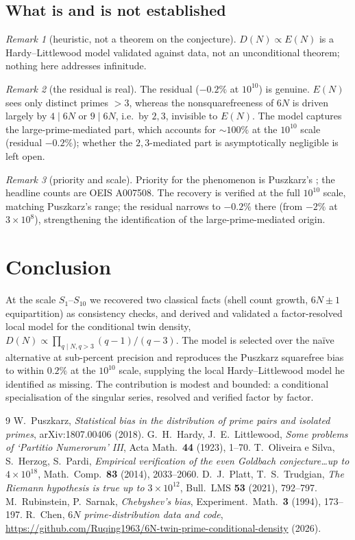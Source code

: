 \documentclass[11pt]{article}
\theoremstyle{definition}
\theoremstyle{remark}
\newtheorem{remark}{Remark}
\begin{document}
\subsection{What is and is not established}
\begin{remark}[heuristic, not a theorem on the conjecture]
$D(N)\propto E(N)$ is a Hardy--Littlewood model validated against data, not an
unconditional theorem; nothing here addresses infinitude.
\end{remark}
\begin{remark}[the residual is real]
The residual ($-0.2\%$ at $10^{10}$) is genuine. $E(N)$ sees only distinct primes $>3$, whereas the
nonsquarefreeness of $6N$ is driven largely by $4\mid6N$ or $9\mid6N$, i.e.\ by
$2,3$, invisible to $E(N)$. The model captures the large-prime-mediated part,
which accounts for $\sim\!100\%$ at the $10^{10}$ scale (residual $-0.2\%$);
whether the $2,3$-mediated part is asymptotically negligible is left open.
\end{remark}
\begin{remark}[priority and scale]
Priority for the phenomenon is Puszkarz's \cite{Puszkarz}; the headline counts are
OEIS A007508. The recovery is verified at the full $10^{10}$ scale, matching Puszkarz's
range; the residual narrows to $-0.2\%$ there (from $-2\%$ at $3\times10^8$),
strengthening the identification of the large-prime-mediated origin.
\end{remark}

\section*{Conclusion}
At the scale $S_1$--$S_{10}$ we recovered two classical facts (shell count growth,
$6N\pm1$ equipartition) as consistency checks, and derived and validated a
factor-resolved local model for the conditional twin density,
$D(N)\propto\prod_{q\mid N,q>3}(q-1)/(q-3)$. The model is selected over the na\"ive
alternative at sub-percent precision and reproduces the Puszkarz squarefree bias to
within $0.2\%$ at the $10^{10}$ scale, supplying the local Hardy--Littlewood model he identified as missing.
The contribution is modest and bounded: a conditional specialisation of the
singular series, resolved and verified factor by factor.

\begin{thebibliography}{9}
 W.~Puszkarz, \emph{Statistical bias in the distribution of prime
pairs and isolated primes}, arXiv:1807.00406 (2018).
 G.~H.~Hardy, J.~E.~Littlewood, \emph{Some problems of `Partitio
Numerorum' III}, Acta Math.\ \textbf{44} (1923), 1--70.
 T.~Oliveira e Silva, S.~Herzog, S.~Pardi, \emph{Empirical
verification of the even Goldbach conjecture\ldots up to $4\times10^{18}$}, Math.\
Comp.\ \textbf{83} (2014), 2033--2060.
 D.~J.~Platt, T.~S.~Trudgian, \emph{The Riemann hypothesis is true
up to $3\times10^{12}$}, Bull.\ LMS \textbf{53} (2021), 792--797.
\bibitem{RubinsteinSarnak} M.~Rubinstein, P.~Sarnak, \emph{Chebyshev's bias},
Experiment.\ Math.\ \textbf{3} (1994), 173--197.
 R.~Chen, \emph{$6N$ prime-distribution data and code},
\url{https://github.com/Ruqing1963/6N-twin-prime-conditional-density} (2026).
\end{thebibliography}
\end{document}
